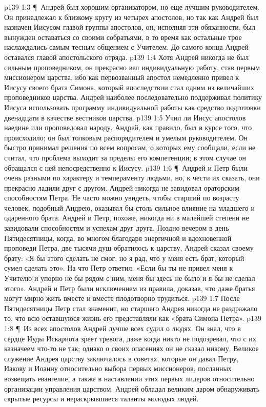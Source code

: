 \vs p139 1:3 \P\ Андрей был хорошим организатором, но еще лучшим руководителем. Он принадлежал к близкому кругу из четырех апостолов, но так как Андрей был назначен Иисусом главой группы апостолов, он, исполняя эти обязанности, был вынужден оставаться со своими собратьями, в то время как остальные трое наслаждались самым тесным общением с Учителем. До самого конца Андрей оставался главой апостольского отряда.
\vs p139 1:4 Хотя Андрей никогда не был сильным проповедником, он прекрасно вел индивидуальную работу, став первым миссионером царства, ибо как первозванный апостол немедленно привел к Иисусу своего брата Симона, который впоследствии стал одним из величайших проповедников царства. Андрей наиболее последовательно поддерживал политику Иисуса использовать программу индивидуальной работы как средство подготовки двенадцати в качестве вестников царства.
\vs p139 1:5 Учил ли Иисус апостолов наедине или проповедовал народу, Андрей, как правило, был в курсе того, что происходило; он был толковым распорядителем и умелым руководителем. Он быстро принимал решения по всем вопросам, о которых ему сообщали, если не считал, что проблема выходит за пределы его компетенции; в этом случае он обращался с ней непосредственно к Иисусу.
\vs p139 1:6 \P\ Андрей и Петр были очень разными по характеру и темпераменту людьми, но, к чести их сказать, они прекрасно ладили друг с другом. Андрей никогда не завидовал ораторским способностям Петра. Не часто можно увидеть, чтобы старший по возрасту человек, подобный Андрею, оказывал бы столь сильное влияние на младшего и одаренного брата. Андрей и Петр, похоже, никогда ни в малейшей степени не завидовали способностям и успехам друг друга. Поздно вечером в день Пятидесятницы, когда, во многом благодаря энергичной и вдохновенной проповеди Петра, две тысячи душ обратилось к царству, Андрей сказал своему брату: «Я бы этого сделать не смог, но я рад, что у меня есть брат, который сумел сделать это». На что Петр ответил: «Если бы ты не привел меня к Учителю и упорно не  бы рядом с ним, меня бы здесь не было и я бы не сделал этого». Андрей и Петр были исключением из правила, доказав, что даже братья могут мирно жить вместе и вместе плодотворно трудиться.
\vs p139 1:7 После Пятидесятницы Петр стал знаменит, но старшего Андрея никогда не раздражало то, что всю оставшуюся жизнь его представляли как «брата Симона Петра».
\vs p139 1:8 \P\ Из всех апостолов Андрей лучше всех судил о людях. Он знал, что в сердце Иуды Искариота зреет тревога, даже когда никто не подозревал, что с их казначеем что\hyp{}то не так; однако о своих опасениях он не сказал никому. Великое служение Андрея царству заключалось в советах, которые он давал Петру, Иакову и Иоанну относительно выбора первых миссионеров, посланных возвещать евангелие, а также в наставлении этих первых лидеров относительно организации управления царством. Андрей обладал великим даром обнаруживать скрытые ресурсы и нераскрывшиеся таланты молодых людей.
